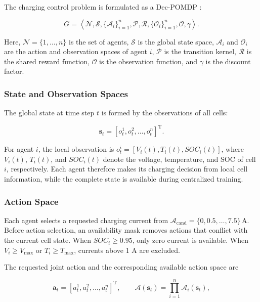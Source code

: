The charging control problem is formulated as a Dec-POMDP \cite{27}:

\[
G=
\left\langle
\mathcal{N},
\mathcal{S},
\{\mathcal{A}_i\}_{i=1}^{n},
\mathcal{P},
\mathcal{R},
\{\mathcal{O}_i\}_{i=1}^{n},
\mathcal{O},
\gamma
\right\rangle .
\]

Here, $\mathcal{N}=\{1,\ldots,n\}$ is the set of agents, $\mathcal{S}$ is the global state space, $\mathcal{A}_i$ and $\mathcal{O}_i$ are the action and observation spaces of agent $i$, $\mathcal{P}$ is the transition kernel, $\mathcal{R}$ is the shared reward function, $\mathcal{O}$ is the observation function, and $\gamma$ is the discount factor.

\subsubsection{State and Observation Spaces}

The global state at time step $t$ is formed by the observations of all cells:

\begin{equation}
\label{eq:global_state}
\mathbf{s}_t
=
\left[
o_t^1,o_t^2,\ldots,o_t^n
\right]^{\mathrm{T}}.
\end{equation}

For agent $i$, the local observation is
$o_t^i=[V_i(t),\allowbreak T_i(t),\allowbreak SOC_i(t)]$, where $V_i(t)$, $T_i(t)$, and $SOC_i(t)$ denote the voltage, temperature, and SOC of cell $i$, respectively. Each agent therefore makes its charging decision from local cell information, while the complete state is available during centralized training.

\subsubsection{Action Space}

Each agent selects a requested charging current from
$\mathcal{A}_{\mathrm{cand}}=\{0,0.5,\ldots,7.5\}\,\mathrm{A}$.
Before action selection, an availability mask removes actions that conflict with the current cell state. When $SOC_i\geq0.95$, only zero current is available. When $V_i\geq V_{\max}$ or $T_i\geq T_{\max}$, currents above 1 A are excluded.

The requested joint action and the corresponding available action space are

\begin{equation}
\label{eq:joint_action}
\mathbf{a}_t
=
\left[
a_t^1,a_t^2,\ldots,a_t^n
\right]^{\mathrm{T}},
\qquad
\mathcal{A}(\mathbf{s}_t)
=
\prod_{i=1}^{n}\mathcal{A}_i(\mathbf{s}_t),
\end{equation}


